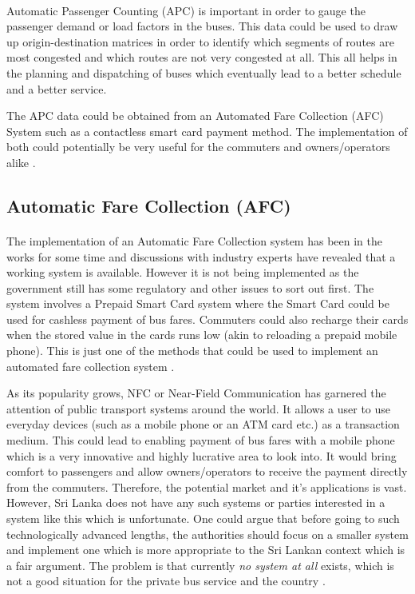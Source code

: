 \paragraph{ } Automatic Passenger Counting (APC) is important in order to gauge the passenger demand or load factors in the buses. This data could be used to draw up origin-destination matrices in order to identify which segments of routes are most congested and which routes are not very congested at all. This all helps in the planning and dispatching of buses which eventually lead to a better schedule and a better service.

The APC data could be obtained from an Automated Fare Collection (AFC) System such as a contactless smart card payment method. The implementation of both could potentially be very useful for the commuters and owners/operators alike \cite{Wilson2009, Silva2010}.

\subsection{Automatic Fare Collection (AFC)}

\paragraph{ } The implementation of an Automatic Fare Collection system has been in the works for some time and discussions with industry experts have revealed that a working system is available. However it is not being implemented as the government still has some regulatory and other issues to sort out first. The system involves a Prepaid Smart Card system where the Smart Card could be used for cashless payment of bus fares. Commuters could also recharge their cards when the stored value in the cards runs low (akin to reloading a prepaid mobile phone). This is just one of the methods that could be used to implement an automated fare collection system \cite{Wilson2009, Silva2010}.

As its popularity grows, NFC or Near-Field Communication has garnered the attention of public transport systems around the world. It allows a user to use everyday devices (such as a mobile phone or an ATM card etc.) as a transaction medium. This could lead to enabling payment of bus fares with a mobile phone which is a very innovative and highly lucrative area to look into. It would bring comfort to passengers and allow owners/operators to receive the payment directly from the commuters. Therefore, the potential market and it's applications is vast. However, Sri Lanka does not have any such systems or parties interested in a system like this which is unfortunate. One could argue that before going to such technologically advanced lengths, the authorities should focus on a smaller system and implement one which is more appropriate to the Sri Lankan context which is a fair argument. The problem is that currently \textit{no system at all} exists, which is not a good situation for the private bus service and the country \cite{Silva2010, Sinha2012}.


